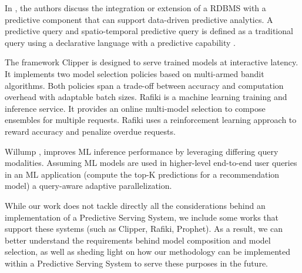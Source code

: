 In \cite{Akdere2011}, the authors discuss the integration or extension of a RDBMS with a predictive component that can support data-driven predictive analytics. A predictive query and spatio-temporal predictive query is defined as a traditional query using a declarative language with a predictive capability \cite{Hendawi2012}. 

The framework Clipper \cite{Crankshaw2017} is designed to serve trained models at interactive latency. It implements two model selection policies based on multi-armed bandit algorithms. Both policies span a trade-off between accuracy and computation overhead with adaptable batch sizes. Rafiki \cite{Wang2018} is a machine learning training and inference service. It provides an online multi-model selection to compose ensembles for multiple requests. Rafiki uses a reinforcement learning approach to reward accuracy and penalize overdue requests. 

Willump \cite{Kraft2019}, improves ML inference performance by leveraging differing query modalities. Assuming ML models are used in higher-level end-to-end user queries in an ML application (compute the top-K predictions for a recommendation model) a query-aware adaptive parallelization.

While our work does not tackle directly all the considerations behind an implementation of a Predictive Serving System, we include some works that support these systems (such as Clipper, Rafiki, Prophet). As a result, we can better understand the requirements behind model composition and model selection, as well as sheding light on how our methodology can be implemented within a Predictive Serving System to serve these purposes in the future.